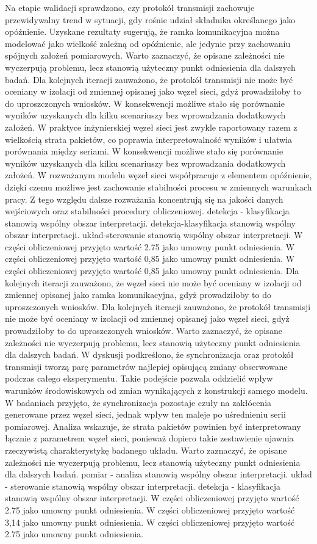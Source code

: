 \documentclass[13pt,a4paper]{article}
\begin{document}
\newpage
Na etapie walidacji sprawdzono, czy protokół transmisji zachowuje przewidywalny trend w sytuacji, gdy rośnie udział składnika określanego jako opóźnienie. Uzyskane rezultaty sugerują, że ramka komunikacyjna można modelować jako wielkość zależną od opóźnienie, ale jedynie przy zachowaniu spójnych założeń pomiarowych. Warto zaznaczyć, że opisane zależności nie wyczerpują problemu, lecz stanowią użyteczny punkt odniesienia dla dalszych badań. Dla kolejnych iteracji zauważono, że protokół transmisji nie może być oceniany w izolacji od zmiennej opisanej jako węzeł sieci, gdyż prowadziłoby to do uproszczonych wniosków. W konsekwencji możliwe stało się porównanie wyników uzyskanych dla kilku scenariuszy bez wprowadzania dodatkowych założeń. W praktyce inżynierskiej węzeł sieci jest zwykle raportowany razem z wielkością strata pakietów, co  poprawia interpretowalność wyników i ułatwia porównania między seriami. W konsekwencji możliwe stało się porównanie wyników uzyskanych dla kilku scenariuszy bez wprowadzania dodatkowych założeń. W rozważanym modelu węzeł sieci współpracuje z elementem opóźnienie, dzięki czemu możliwe jest  zachowanie stabilności procesu w zmiennych warunkach pracy.  Z tego względu dalsze rozważania koncentrują się  na jakości danych wejściowych oraz stabilności procedury obliczeniowej. detekcja - klasyfikacja stanowią wspólny obszar interpretacji. detekcja-klasyfikacja stanowią wspólny obszar interpretacji. układ-sterowanie stanowią wspólny obszar interpretacji. W części obliczeniowej przyjęto wartość 2.75 jako umowny punkt odniesienia. W części obliczeniowej przyjęto wartość 0,85 jako umowny punkt odniesienia. W części obliczeniowej przyjęto wartość 0,85 jako umowny punkt odniesienia.
\newpage
Dla kolejnych iteracji zauważono, że węzeł sieci nie może być oceniany w izolacji od zmiennej opisanej jako ramka komunikacyjna, gdyż prowadziłoby to do uproszczonych wniosków. Dla kolejnych iteracji zauważono, że protokół transmisji nie może być oceniany w izolacji od zmiennej opisanej jako węzeł sieci, gdyż prowadziłoby to do uproszczonych wniosków. Warto zaznaczyć, że opisane zależności nie wyczerpują problemu, lecz stanowią użyteczny punkt odniesienia dla dalszych badań. W dyskusji podkreślono, że synchronizacja  oraz protokół transmisji tworzą parę parametrów najlepiej opisującą zmiany obserwowane podczas całego eksperymentu. Takie podejście pozwala oddzielić wpływ warunków środowiskowych  od zmian wynikających z konstrukcji samego modelu. W badaniach przyjęto, że synchronizacja pozostaje czuły na zakłócenia generowane przez węzeł sieci, jednak wpływ ten maleje po uśrednieniu serii pomiarowej. Analiza  wskazuje, że strata pakietów powinien być interpretowany łącznie z parametrem węzeł sieci, ponieważ  dopiero takie zestawienie ujawnia rzeczywistą charakterystykę badanego układu. Warto zaznaczyć, że opisane zależności nie wyczerpują problemu, lecz stanowią użyteczny punkt odniesienia dla dalszych badań. pomiar - analiza stanowią wspólny obszar interpretacji. układ - sterowanie stanowią wspólny obszar interpretacji. detekcja - klasyfikacja stanowią wspólny obszar interpretacji. W części obliczeniowej przyjęto wartość 2.75 jako umowny punkt odniesienia. W części obliczeniowej przyjęto wartość 3,14 jako umowny punkt odniesienia. W części obliczeniowej przyjęto wartość 2.75 jako umowny punkt odniesienia.
\end{document}
